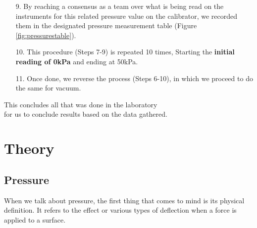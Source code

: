 \documentclass{article}
\begin{document}
	\begin{minipage}{0.51\textwidth}\vspace{-2em}\raggedright
		\begin{enumerate}[left=0in]
			\item[9.]  By reaching a consensus as a team over what is being read on the instruments for this related pressure value on the calibrator, we recorded them in the designated pressure measurement table (Figure \ref{fig:pressurestable}). 
			\item[10.] This procedure (Steps 7-9) is repeated 10 times, Starting the \textbf{initial reading of 0kPa} and ending at 50kPa. 
			\item[11.] Once done, we reverse the process (Steps 6-10), in which we proceed to do the same for vacuum.
		\end{enumerate}\noindent
		This concludes all that was done in the laboratory\\ for us to conclude results based on the data gathered.
	\end{minipage}
	
	\newpage\restoregeometry
	\section{Theory}
	
	\subsection{Pressure}
	
	When we talk about pressure, the first thing that comes to mind is its physical definition. It refers to the effect or various types of deflection when a force is applied to a surface.
	
\end{document}
